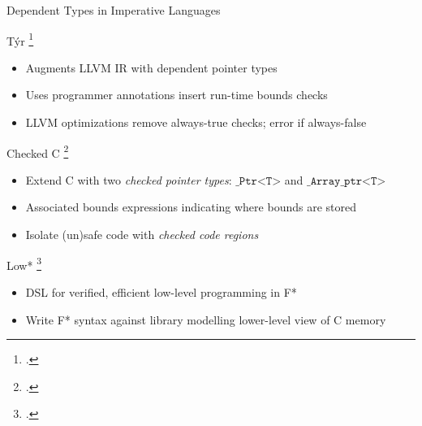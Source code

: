 \documentclass[aspectratio=169]{beamer}
\begin{document}
\begin{frame}{Dependent Types in Imperative Languages}

T\'yr \footcite{de_araujo_tyr:_2016}
\vspace{-0.1in}
\begin{itemize}
    \item Augments LLVM IR with dependent pointer types
    \item Uses programmer annotations insert run-time bounds checks
    \item LLVM optimizations remove always-true checks; error if always-false
\end{itemize}

\pause

Checked C \footcite{ruef_checked_2017}
\vspace{-0.1in}
    \begin{itemize}
        \item Extend C with two \emph{checked pointer types}: $\texttt{\_Ptr<T>}$ and $\texttt{\_Array\_ptr<T>}$ 
        \item Associated bounds expressions indicating where bounds are stored
        \item Isolate (un)safe code with \emph{checked code regions}  
    \end{itemize}

\pause

Low* \footcite{protzenko_verified_2017}
\vspace{-0.1in}
\begin{itemize}
    \item DSL for verified, efficient low-level programming in F* %
    \item Write F* syntax against library modelling lower-level view of C memory
\end{itemize}
\vspace{0.1in}
\end{frame}
\end{document}
